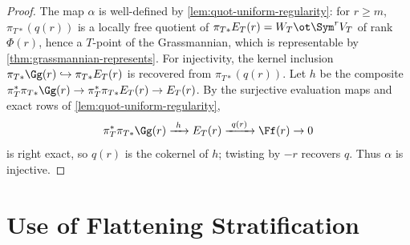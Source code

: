 \begin{proof}
  The map $\alpha$ is well-defined by \cref{lem:quot-uniform-regularity}: for
  $r \ge m$, $\pi_{T*}(q(r))$ is a locally free quotient of
  $\pi_{T*}E_T(r) = W_T \ot \Sym^r V_T$ of rank $\Phi(r)$, hence a $T$-point of
  the Grassmannian, which is representable by \cref{thm:grassmannian-represents}.
  For injectivity, the kernel inclusion $\pi_{T*}\Gg(r) \hookrightarrow
  \pi_{T*}E_T(r)$ is recovered from $\pi_{T*}(q(r))$. Let $h$ be the composite
  $\pi_T^*\pi_{T*}\Gg(r) \to \pi_T^*\pi_{T*}E_T(r) \to E_T(r)$. By the surjective
  evaluation maps and exact rows of \cref{lem:quot-uniform-regularity},
  \[
    \pi_T^*\pi_{T*}\Gg(r) \xrightarrow{\ h\ } E_T(r) \xrightarrow{\ q(r)\ } \Ff(r) \to 0
  \]
  is right exact, so $q(r)$ is the cokernel of $h$; twisting by $-r$ recovers
  $q$. Thus $\alpha$ is injective.
\end{proof}

\bigskip
\section*{Use of Flattening Stratification}
\medskip

